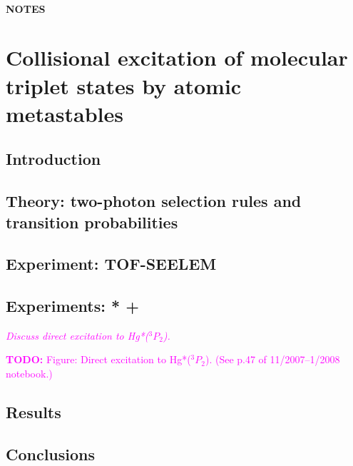 \documentclass[12pt]{mitthesis}
\newcommand{\TODO} [1]{\textcolor{magenta}{\textbf{TODO:} #1}}
\newcommand{\POINT}[1]{\textcolor{magenta}{\emph{#1}}}
\begin{document}
\tableofcontents
\clearpage

\subsubsection*{NOTES}
\clearpage

\chapter{Collisional excitation of molecular triplet states by atomic metastables}

\section{Introduction}

\section{Theory: two-photon selection rules and transition probabilities}

\section{Experiment: TOF-SEELEM}

\section{Experiments: * + }

\POINT{Discuss direct excitation to Hg*($^3P_2$).}

\TODO{Figure: Direct excitation to Hg*($^3P_2$). (See p.47 of
  11/2007--1/2008 notebook.)}

\section{Results}

\section{Conclusions}
\end{document}

